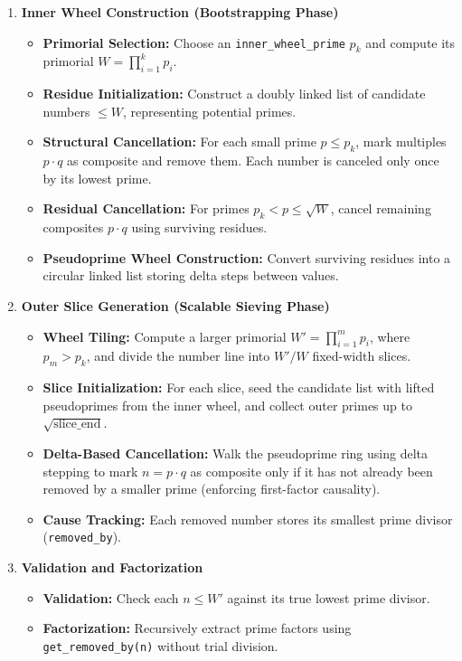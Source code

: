 \begin{enumerate}
  \item \textbf{Inner Wheel Construction (Bootstrapping Phase)}
  \begin{itemize}
    \item \textbf{Primorial Selection:} Choose an \texttt{inner\_wheel\_prime} \( p_k \) and compute its primorial \( W = \prod_{i=1}^{k} p_i \).
    \item \textbf{Residue Initialization:} Construct a doubly linked list of candidate numbers \( \leq W \), representing potential primes.
    \item \textbf{Structural Cancellation:} For each small prime \( p \leq p_k \), mark multiples \( p \cdot q \) as composite and remove them. Each number is canceled only once by its lowest prime.
    \item \textbf{Residual Cancellation:} For primes \( p_k < p \leq \sqrt{W} \), cancel remaining composites \( p \cdot q \) using surviving residues.
    \item \textbf{Pseudoprime Wheel Construction:} Convert surviving residues into a circular linked list storing delta steps between values.
  \end{itemize}

  \item \textbf{Outer Slice Generation (Scalable Sieving Phase)}
  \begin{itemize}
    \item \textbf{Wheel Tiling:} Compute a larger primorial \( W' = \prod_{i=1}^{m} p_i \), where \( p_m > p_k \), and divide the number line into \( W'/W \) fixed-width slices.
    \item \textbf{Slice Initialization:} For each slice, seed the candidate list with lifted pseudoprimes from the inner wheel, and collect outer primes up to \( \sqrt{\text{slice\_end}} \).
    \item \textbf{Delta-Based Cancellation:} Walk the pseudoprime ring using delta stepping to mark \( n = p \cdot q \) as composite only if it has not already been removed by a smaller prime (enforcing first-factor causality).
    \item \textbf{Cause Tracking:} Each removed number stores its smallest prime divisor (\texttt{removed\_by}).
  \end{itemize}

  \item \textbf{Validation and Factorization}
  \begin{itemize}
    \item \textbf{Validation:} Check each \( n \leq W' \) against its true lowest prime divisor.
    \item \textbf{Factorization:} Recursively extract prime factors using \texttt{get\_removed\_by(n)} without trial division.
  \end{itemize}
\end{enumerate}

